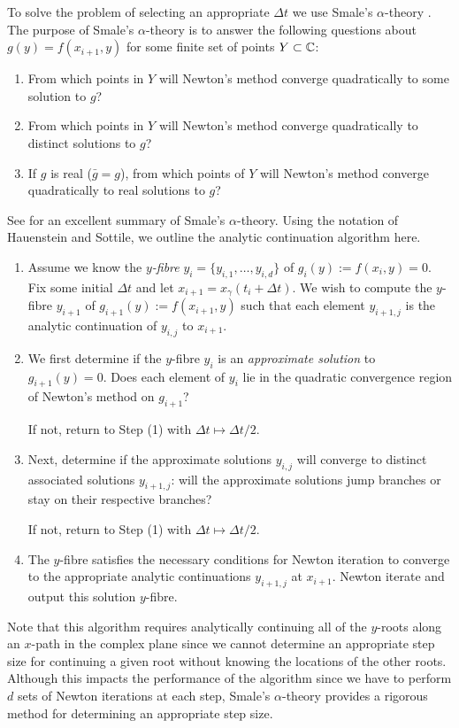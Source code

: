 To solve the problem of selecting an appropriate $\Delta t$ we use Smale's
$\alpha$-theory \cite{Smale85}. The purpose of Smale's $\alpha$-theory is to
answer the following questions about $g(y) = f(x_{i+1},y)$ for some finite set
of points $Y \subset \operatorname{\mathbb{C}}$:
\begin{enumerate}
\item From which points in $Y$ will Newton's method converge quadratically to
  some solution to $g$?
\item From which points in $Y$ will Newton's method converge quadratically to
  distinct solutions to $g$?
\item If $g$ is real ($\bar{g} = g$), from which points of $Y$ will Newton's
  method converge quadratically to real solutions to $g$?
\end{enumerate}
See \cite{HauensteinSottile10} for an excellent summary of Smale's
$\alpha$-theory. Using the notation of Hauenstein and Sottile, we outline the
analytic continuation algorithm here.
\begin{enumerate}
\item Assume we know the {\it $y$-fibre} $y_i = \{y_{i,1},\ldots,y_{i,d}\}$ of
  $g_i(y) := f(x_i,y)=0$. Fix some initial $\Delta t$ and let $x_{i+1} =
  x_\gamma(t_i + \Delta t)$. We wish to compute the $y$-fibre $y_{i+1}$ of
  $g_{i+1}(y) := f(x_{i+1},y)$ such that each element $y_{i+1,j}$ is the
  analytic continuation of $y_{i,j}$ to $x_{i+1}$.
\item We first determine if the $y$-fibre $y_i$ is an {\it approximate solution}
  to $g_{i+1}(y) = 0$. Does each element of $y_i$ lie in the quadratic
  convergence region of Newton's method on $g_{i+1}$?

  If not, return to Step (1) with $\Delta t \mapsto \Delta t / 2$.
\item Next, determine if the approximate solutions $y_{i,j}$ will converge to
  distinct associated solutions $y_{i+1,j}$: will the approximate solutions jump
  branches or stay on their respective branches?

  If not, return to Step (1) with $\Delta t \mapsto \Delta t / 2$.
\item The $y$-fibre satisfies the necessary conditions for Newton iteration to
  converge to the appropriate analytic continuations $y_{i+1,j}$ at $x_{i+1}$.
  Newton iterate and output this solution $y$-fibre.
\end{enumerate}

Note that this algorithm requires analytically continuing all of the $y$-roots
along an $x$-path in the complex plane since we cannot determine an appropriate
step size for continuing a given root without knowing the locations of the other
roots. Although this impacts the performance of the algorithm since we have to
perform $d$ sets of Newton iterations at each step, Smale's $\alpha$-theory
provides a rigorous method for determining an appropriate step size.


